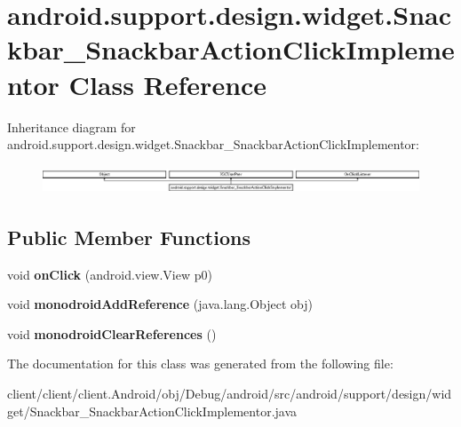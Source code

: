 \hypertarget{classandroid_1_1support_1_1design_1_1widget_1_1Snackbar__SnackbarActionClickImplementor}{}\section{android.\+support.\+design.\+widget.\+Snackbar\+\_\+\+Snackbar\+Action\+Click\+Implementor Class Reference}
\label{classandroid_1_1support_1_1design_1_1widget_1_1Snackbar__SnackbarActionClickImplementor}
Inheritance diagram for android.\+support.\+design.\+widget.\+Snackbar\+\_\+\+Snackbar\+Action\+Click\+Implementor\+:\begin{figure}[H]
\begin{center}
\leavevmode
\includegraphics[height=0.848485cm]{classandroid_1_1support_1_1design_1_1widget_1_1Snackbar__SnackbarActionClickImplementor}
\end{center}
\end{figure}
\subsection*{Public Member Functions}
\begin{DoxyCompactItemize}
\item 
\hypertarget{classandroid_1_1support_1_1design_1_1widget_1_1Snackbar__SnackbarActionClickImplementor_a586c92095bd4bf2197feac9cf0024e30}{}void {\bfseries on\+Click} (android.\+view.\+View p0)\label{classandroid_1_1support_1_1design_1_1widget_1_1Snackbar__SnackbarActionClickImplementor_a586c92095bd4bf2197feac9cf0024e30}

\item 
\hypertarget{classandroid_1_1support_1_1design_1_1widget_1_1Snackbar__SnackbarActionClickImplementor_a16a751ffa24007d654bc9ce4f58393b1}{}void {\bfseries monodroid\+Add\+Reference} (java.\+lang.\+Object obj)\label{classandroid_1_1support_1_1design_1_1widget_1_1Snackbar__SnackbarActionClickImplementor_a16a751ffa24007d654bc9ce4f58393b1}

\item 
\hypertarget{classandroid_1_1support_1_1design_1_1widget_1_1Snackbar__SnackbarActionClickImplementor_adc6c8f5bc2dfa81c878c441b7cd1aabe}{}void {\bfseries monodroid\+Clear\+References} ()\label{classandroid_1_1support_1_1design_1_1widget_1_1Snackbar__SnackbarActionClickImplementor_adc6c8f5bc2dfa81c878c441b7cd1aabe}

\end{DoxyCompactItemize}


The documentation for this class was generated from the following file\+:\begin{DoxyCompactItemize}
\item 
client/client/client.\+Android/obj/\+Debug/android/src/android/support/design/widget/Snackbar\+\_\+\+Snackbar\+Action\+Click\+Implementor.\+java\end{DoxyCompactItemize}
